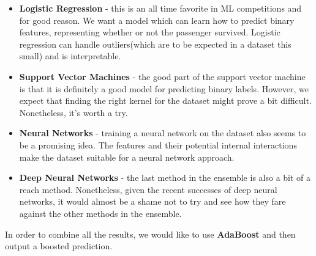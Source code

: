 \documentclass{article}
\begin{document}
\begin{itemize}
\item \textbf{Logistic Regression} - this is an all time favorite in ML competitions and for good reason. We want a model which can learn how to predict binary features, representing whether or not the passenger survived. Logistic regression can handle outliers(which are to be expected in a dataset this small) and is interpretable.

\item \textbf{Support Vector Machines} - the good part of the support vector machine is that it is definitely a good model for predicting binary labels. However, we expect that finding the right kernel for the dataset might prove a bit difficult. Nonetheless, it's worth a try.

\item \textbf{Neural Networks} - training a neural network on the dataset also seems to be a promising idea. The features and their potential internal interactions make the dataset suitable for a neural network approach.


\item \textbf{Deep Neural Networks} - the last method in the ensemble is also a bit of a reach method. Nonetheless, given the recent successes of deep neural networks, it would almost be a shame not to try and see how they fare against the other methods in the ensemble.
\end{itemize}

In order to combine all the results, we would like to use \textbf{AdaBoost} and then output a boosted prediction.
\end{document}
